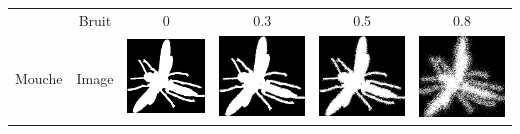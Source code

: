 \documentclass{article}
\theoremstyle{definition}
\begin{document}
	  \begin{table}[!h] %
	  \centering
	  \begin{tabular}{|c|c|c|c|c|c|}
	    \hline
	    & Bruit & 0 & 0.3 & 0.5 & 0.8 \\
	    \cline{2-6}
	    Mouche & Image & \includegraphics[scale=0.15]{Illustrations/fly-6.png} & \includegraphics[scale=0.15]{Illustrations/fly-6(3).png} & \includegraphics[scale=0.15]{Illustrations/fly-6(5).png} & \includegraphics[scale=0.15]{Illustrations/fly-6(8).png} \\

\end{tabular}
\end{table}
\end{document}
